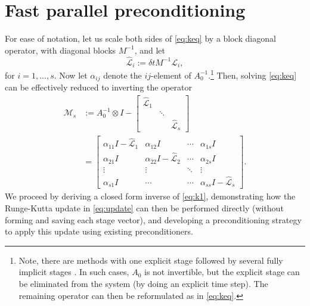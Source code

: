\documentclass[a4paper,10pt]{article}
\begin{document}
\section{Fast parallel preconditioning}\label{sec:solve}

For ease of notation, let us scale both sides of \eqref{eq:keq} by a block
diagonal operator, with diagonal blocks $M^{-1}$, and let
%
\begin{equation*}
\widehat{\mathcal{L}}_i := \delta t M^{-1}\mathcal{L}_i,
\end{equation*}
%
for $i=1,...,s$. Now let $\alpha_{ij}$ denote the $ij$-element
of $A_0^{-1}$.\footnote{Note, there are
methods with one explicit stage followed by several fully implicit stages \cite{butcher00}.
In such cases, $A_0$ is not invertible, but the explicit stage can
be eliminated from the system (by doing an explicit time step). The remaining operator
can then be reformulated as in \eqref{eq:keq}.}
Then, solving \eqref{eq:keq} can be effectively reduced to inverting the operator
%
\begin{align}\nonumber
\mathcal{M}_s & := A_0^{-1}\otimes I - \begin{bmatrix} \widehat{\mathcal{L}}_1  & \\ & \ddots \\ && \widehat{\mathcal{L}}_s\end{bmatrix} \\
& = \begin{bmatrix} \alpha_{11}I - \widehat{\mathcal{L}}_1 & \alpha_{12}I & \cdots & \alpha_{1s}I \\
	\alpha_{21}I & \alpha_{22}I - \widehat{\mathcal{L}}_2 & \cdots & \alpha_{2s}I \\
	\vdots & \vdots & \ddots & \vdots \\ \alpha_{s1}I & \cdots & \cdots & \alpha_{ss}I - \widehat{\mathcal{L}}_s \end{bmatrix}.
	\label{eq:k1}
\end{align}
%
We proceed by deriving a closed form inverse of \eqref{eq:k1}, demonstrating
how the Runge-Kutta update in \eqref{eq:update} can then be performed directly
(without forming and saving each stage vector), and developing a preconditioning
strategy to apply this update using existing preconditioners.
\end{document}
